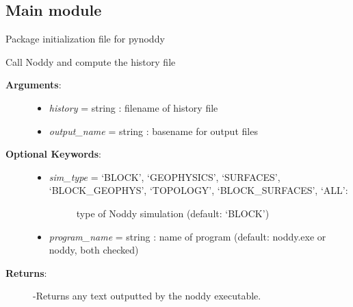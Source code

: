 \documentclass[a4paper,10pt,english]{sphinxmanual}
\begin{document}
\subsection{Main module}
\label{pynoddy:main-module}\label{pynoddy:module-pynoddy}
Package initialization file for pynoddy

\begin{fulllineitems}
\label{pynoddy:pynoddy.compute_model}
Call Noddy and compute the history file
\begin{description}
\item[{\textbf{Arguments}:}] \leavevmode\begin{itemize}
\item {} 
\emph{history} = string : filename of history file

\item {} 
\emph{output\_name} = string : basename for output files

\end{itemize}

\item[{\textbf{Optional Keywords}:}] \leavevmode\begin{itemize}
\item {} \begin{description}
\item[{\emph{sim\_type} = `BLOCK', `GEOPHYSICS', `SURFACES', `BLOCK\_GEOPHYS', `TOPOLOGY', `BLOCK\_SURFACES', `ALL':}] \leavevmode
type of Noddy simulation (default: `BLOCK')

\end{description}

\item {} 
\emph{program\_name} = string : name of program (default: noddy.exe or noddy, both checked)

\end{itemize}

\item[{\textbf{Returns}:}] \leavevmode
-Returns any text outputted by the noddy executable.

\end{description}

\end{fulllineitems}

\end{document}
